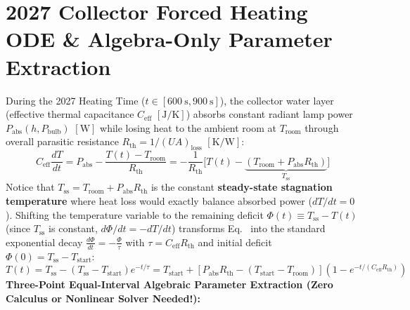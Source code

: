 \section{2027 Collector Forced Heating ODE \& Algebra-Only Parameter Extraction}
\label{sec:13.2}

\begin{derivation}
During the 2027 Heating Time ($t \in [\SI{600}{\second}, \SI{900}{\second}]$), the collector water layer (effective thermal capacitance $C_{\mathrm{eff}}$ $[\si{\joule\per\kelvin}]$) absorbs constant radiant lamp power $P_{\mathrm{abs}}(h, P_{\mathrm{bulb}})$ $[\si{\watt}]$ while losing heat to the ambient room at $T_{\mathrm{room}}$ through overall parasitic resistance $R_{\mathrm{th}} = 1/(UA)_{\mathrm{loss}}$ $[\si{\kelvin\per\watt}]$:
\begin{equation}
  C_{\mathrm{eff}}\frac{dT}{dt} = P_{\mathrm{abs}} - \frac{T(t) - T_{\mathrm{room}}}{R_{\mathrm{th}}} = -\frac{1}{R_{\mathrm{th}}}\Big[T(t) - \underbrace{\left(T_{\mathrm{room}} + P_{\mathrm{abs}} R_{\mathrm{th}}\right)}_{T_{\mathrm{ss}}}\Big]
  \label{eq:13:forced-ode}
\end{equation}
Notice that $T_{\mathrm{ss}} = T_{\mathrm{room}} + P_{\mathrm{abs}} R_{\mathrm{th}}$ is the constant \textbf{steady-state stagnation temperature} where heat loss would exactly balance absorbed power ($dT/dt = 0$). Shifting the temperature variable to the remaining deficit $\Phi(t) \equiv T_{\mathrm{ss}} - T(t)$ (since $T_{\mathrm{ss}}$ is constant, $d\Phi/dt = -dT/dt$) transforms Eq.~ into the standard exponential decay $\frac{d\Phi}{dt} = -\frac{\Phi}{\tau}$ with $\tau = C_{\mathrm{eff}}R_{\mathrm{th}}$ and initial deficit $\Phi(0) = T_{\mathrm{ss}} - T_{\mathrm{start}}$:
\begin{equation}
  \boxed{T(t) = T_{\mathrm{ss}} - \left(T_{\mathrm{ss}} - T_{\mathrm{start}}\right)e^{-t/\tau} = T_{\mathrm{start}} + \left[P_{\mathrm{abs}}R_{\mathrm{th}} - \left(T_{\mathrm{start}} - T_{\mathrm{room}}\right)\right]\!\left(1 - e^{-t/(C_{\mathrm{eff}}R_{\mathrm{th}})}\right)}
  \label{eq:13:forced-solution}
\end{equation}
\textbf{Three-Point Equal-Interval Algebraic Parameter Extraction (Zero Calculus or Nonlinear Solver Needed!):}

\end{derivation}
